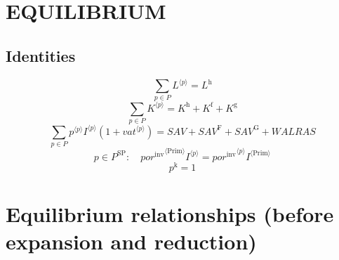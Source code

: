 \section{EQUILIBRIUM}

\subsection{Identities}

\begin{equation}
\sum_{p\in P} {L}^{\langle p\rangle} = L^{\mathrm{h}}
\end{equation}
\begin{equation}
\sum_{p\in P} {K}^{\langle p\rangle} = K^{\mathrm{h}} + K^{\mathrm{f}} + K^{\mathrm{g}}
\end{equation}
\begin{equation}
\sum_{p\in P} {{p}^{\langle p\rangle}} {{I}^{\langle p\rangle}} \left(1 + {{v\!a\!t}}^{\langle p\rangle}\right) = {S\!A\!V} + {S\!A\!V}^{\mathrm{F}} + {S\!A\!V}^{\mathrm{G}} + {W\!A\!L\!R\!A\!S}
\end{equation}
\begin{equation}
p\in P^{\mathrm{SP}}\colon\quad {{{p\!o\!r}^{\mathrm{inv}}}^{\langle \mathrm{\mathrm{Prim}}\rangle}} {{I}^{\langle p\rangle}} = {{{p\!o\!r}^{\mathrm{inv}}}^{\langle p\rangle}} {{I}^{\langle \mathrm{Prim}\rangle}}
\end{equation}
\begin{equation}
p^{\mathrm{k}} = 1
\end{equation}




\section{Equilibrium relationships (before expansion and reduction)}

